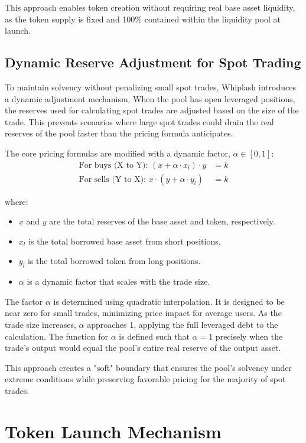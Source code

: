 \documentclass[11pt]{article}
\begin{document}
This approach enables token creation without requiring real base asset liquidity, as the token supply is fixed and 100\% contained within the liquidity pool at launch.

\subsection{Dynamic Reserve Adjustment for Spot Trading}

To maintain solvency without penalizing small spot trades, Whiplash introduces a dynamic adjustment mechanism. When the pool has open leveraged positions, the reserves used for calculating spot trades are adjusted based on the size of the trade. This prevents scenarios where large spot trades could drain the real reserves of the pool faster than the pricing formula anticipates.

The core pricing formulas are modified with a dynamic factor, $\alpha \in [0, 1]$:
\begin{align}
\text{For buys (X to Y): } (x + \alpha \cdot x_l) \cdot y &= k \\
\text{For sells (Y to X): } x \cdot (y + \alpha \cdot y_l) &= k
\end{align}

where:
\begin{itemize}
    \item $x$ and $y$ are the total reserves of the base asset and token, respectively.
    \item $x_l$ is the total borrowed base asset from short positions.
    \item $y_l$ is the total borrowed token from long positions.
    \item $\alpha$ is a dynamic factor that scales with the trade size.
\end{itemize}

The factor $\alpha$ is determined using quadratic interpolation. It is designed to be near zero for small trades, minimizing price impact for average users. As the trade size increases, $\alpha$ approaches 1, applying the full leveraged debt to the calculation. The function for $\alpha$ is defined such that $\alpha=1$ precisely when the trade's output would equal the pool's entire real reserve of the output asset.

This approach creates a "soft" boundary that ensures the pool's solvency under extreme conditions while preserving favorable pricing for the majority of spot trades.

\section{Token Launch Mechanism}
\end{document}
